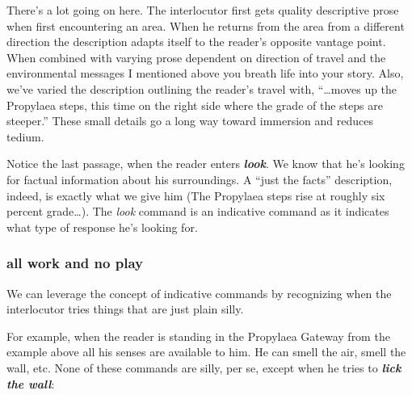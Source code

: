 There's a lot going on here. The interlocutor first gets quality descriptive
prose when first encountering an area. When he returns from the area from a
different direction the description adapts itself to the reader's opposite
vantage point. When combined with varying prose dependent on direction of travel
and the environmental messages I mentioned above you breath life into your
story.
Also, we've varied the description outlining the reader's travel with, ``\ldots moves
up the Propylaea steps, this time on the right side where the grade of the steps
are steeper.'' These small details go a long way toward immersion and reduces tedium.

Notice the last passage, when the reader enters \textbf{\textit{look}}. We know that he's looking for factual
information about his surroundings. A ``just the facts'' description, indeed, is
exactly what we give him (The Propylaea steps rise at roughly six percent grade\ldots). The \textit{look} command is an indicative command as
it indicates what type of response he's looking for.

\subsubsection{all work and no play}
\label{play}

We can leverage the concept of indicative commands by recognizing when the
interlocutor tries things that are just plain silly.

For example, when the reader is standing in the Propylaea Gateway from the example above all his senses
are available to him. He can smell the air, smell the wall, etc. None of these
commands are silly, per se, except when he tries to \textbf{\textit{lick the wall}}:

